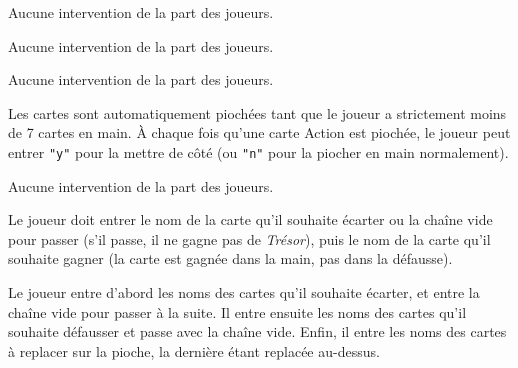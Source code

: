 \documentclass[12pt]{td}
\begin{document}
{Aucune intervention de la part des joueurs.}

\vspace{-0.2cm}
{Aucune intervention de la part des joueurs.}

\vspace{-0.2cm}
{Aucune intervention de la part des joueurs.}

\vspace{-0.2cm}
{Les cartes sont automatiquement piochées tant que le joueur a strictement moins de 7 cartes en main. À chaque fois qu'une carte Action est piochée, le joueur peut entrer \texttt{"y"} pour la mettre de côté (ou \texttt{"n"} pour la piocher en main normalement).}

\vspace{-0.2cm}
{Aucune intervention de la part des joueurs.}

\vspace{-0.2cm}
{Le joueur doit entrer le nom de la carte qu'il souhaite écarter ou la chaîne vide pour passer (s'il passe, il ne gagne pas de \emph{Trésor}), puis le nom de la carte qu'il souhaite gagner (la carte est gagnée dans la main, pas dans la défausse).}

{Le joueur entre d'abord les noms des cartes qu'il souhaite écarter, et entre la chaîne vide pour passer à la suite. Il entre ensuite les noms des cartes qu'il souhaite défausser et passe avec la chaîne vide. Enfin, il entre les noms des cartes à replacer sur la pioche, la dernière étant replacée au-dessus.}
\end{document}
